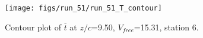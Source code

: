 \begin{figure}[H]
\centering
\texttt{[image: figs/run\_51/run\_51\_T\_contour]}
\caption{Contour plot of $\overline{t}$ at $z/c$=9.50, $V_{free}$=15.31, station 6.}
\end{figure}



